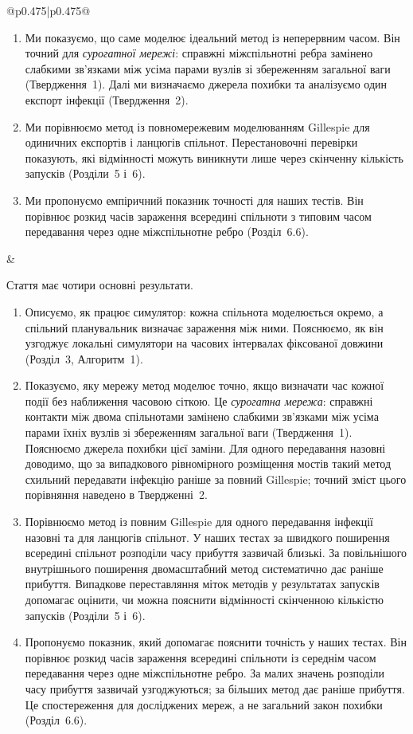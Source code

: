 \documentclass[11pt]{article}
\begin{document}
\begin{longtable}{@{}p{0.475\textwidth}|p{0.475\textwidth}@{}}
\begin{minipage}[t]{\linewidth}
\begin{enumerate}
\item Ми показуємо, що саме моделює ідеальний метод із неперервним часом. Він точний для \emph{сурогатної мережі}: справжні міжспільнотні ребра замінено слабкими зв'язками між усіма парами вузлів зі збереженням загальної ваги (Твердження~1). Далі ми визначаємо джерела похибки та аналізуємо один експорт інфекції (Твердження~2).
\item Ми порівнюємо метод із повномережевим моделюванням Gillespie для одиничних експортів і ланцюгів спільнот. Перестановочні перевірки показують, які відмінності можуть виникнути лише через скінченну кількість запусків (Розділи~5 і~6).
\item Ми пропонуємо емпіричний показник точності для наших тестів. Він порівнює розкид часів зараження всередині спільноти з типовим часом передавання через одне міжспільнотне ребро (Розділ~6.6).
\end{enumerate}
\end{minipage} &
\begin{minipage}[t]{\linewidth}
Стаття має чотири основні результати.
\begin{enumerate}
\item Описуємо, як працює симулятор: кожна спільнота моделюється окремо, а спільний планувальник визначає зараження між ними. Пояснюємо, як він узгоджує локальні симулятори на часових інтервалах фіксованої довжини (Розділ~3, Алгоритм~1).
\item Показуємо, яку мережу метод моделює точно, якщо визначати час кожної події без наближення часовою сіткою. Це \emph{сурогатна мережа}: справжні контакти між двома спільнотами замінено слабкими зв'язками між усіма парами їхніх вузлів зі збереженням загальної ваги (Твердження~1). Пояснюємо джерела похибки цієї заміни. Для одного передавання назовні доводимо, що за випадкового рівномірного розміщення мостів такий метод схильний передавати інфекцію раніше за повний Gillespie; точний зміст цього порівняння наведено в Твердженні~2.
\item Порівнюємо метод із повним Gillespie для одного передавання інфекції назовні та для ланцюгів спільнот. У наших тестах за швидкого поширення всередині спільнот розподіли часу прибуття зазвичай близькі. За повільнішого внутрішнього поширення двомасштабний метод систематично дає раніше прибуття. Випадкове переставляння міток методів у результатах запусків допомагає оцінити, чи можна пояснити відмінності скінченною кількістю запусків (Розділи~5 і~6).
\item Пропонуємо показник, який допомагає пояснити точність у наших тестах. Він порівнює розкид часів зараження всередині спільноти із середнім часом передавання через одне міжспільнотне ребро. За малих значень розподіли часу прибуття зазвичай узгоджуються; за більших метод дає раніше прибуття. Це спостереження для досліджених мереж, а не загальний закон похибки (Розділ~6.6).

\end{enumerate}
\end{minipage}
\end{longtable}
\end{document}
